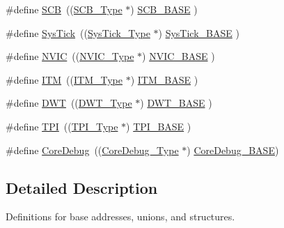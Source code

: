 \begin{DoxyCompactItemize}
\item 
\#define \hyperlink{group___c_m_s_i_s__core__base_gaaaf6477c2bde2f00f99e3c2fd1060b01}{S\+CB}~((\hyperlink{struct_s_c_b___type}{S\+C\+B\+\_\+\+Type}       $\ast$)     \hyperlink{group___c_m_s_i_s__core__base_gad55a7ddb8d4b2398b0c1cfec76c0d9fd}{S\+C\+B\+\_\+\+B\+A\+SE}      )
\item 
\#define \hyperlink{group___c_m_s_i_s__core__base_gacd96c53beeaff8f603fcda425eb295de}{Sys\+Tick}~((\hyperlink{struct_sys_tick___type}{Sys\+Tick\+\_\+\+Type}   $\ast$)     \hyperlink{group___c_m_s_i_s__core__base_ga58effaac0b93006b756d33209e814646}{Sys\+Tick\+\_\+\+B\+A\+SE}  )
\item 
\#define \hyperlink{group___c_m_s_i_s__core__base_gac8e97e8ce56ae9f57da1363a937f8a17}{N\+V\+IC}~((\hyperlink{struct_n_v_i_c___type}{N\+V\+I\+C\+\_\+\+Type}      $\ast$)     \hyperlink{group___c_m_s_i_s__core__base_gaa0288691785a5f868238e0468b39523d}{N\+V\+I\+C\+\_\+\+B\+A\+SE}     )
\item 
\#define \hyperlink{group___c_m_s_i_s__core__base_gabae7cdf882def602cb787bb039ff6a43}{I\+TM}~((\hyperlink{struct_i_t_m___type}{I\+T\+M\+\_\+\+Type}       $\ast$)     \hyperlink{group___c_m_s_i_s__core__base_gadd76251e412a195ec0a8f47227a8359e}{I\+T\+M\+\_\+\+B\+A\+SE}      )
\item 
\#define \hyperlink{group___c_m_s_i_s__core__base_gabbe5a060185e1d5afa3f85b14e10a6ce}{D\+WT}~((\hyperlink{struct_d_w_t___type}{D\+W\+T\+\_\+\+Type}       $\ast$)     \hyperlink{group___c_m_s_i_s__core__base_gafdab534f961bf8935eb456cb7700dcd2}{D\+W\+T\+\_\+\+B\+A\+SE}      )
\item 
\#define \hyperlink{group___c_m_s_i_s__core__base_ga8b4dd00016aed25a0ea54e9a9acd1239}{T\+PI}~((\hyperlink{struct_t_p_i___type}{T\+P\+I\+\_\+\+Type}       $\ast$)     \hyperlink{group___c_m_s_i_s__core__base_ga2b1eeff850a7e418844ca847145a1a68}{T\+P\+I\+\_\+\+B\+A\+SE}      )
\item 
\#define \hyperlink{group___c_m_s_i_s__core__base_gab6e30a2b802d9021619dbb0be7f5d63d}{Core\+Debug}~((\hyperlink{struct_core_debug___type}{Core\+Debug\+\_\+\+Type} $\ast$)     \hyperlink{group___c_m_s_i_s__core__base_ga680604dbcda9e9b31a1639fcffe5230b}{Core\+Debug\+\_\+\+B\+A\+SE})
\end{DoxyCompactItemize}


\subsection{Detailed Description}
Definitions for base addresses, unions, and structures. 



